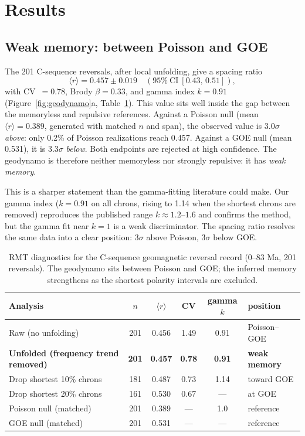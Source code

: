 \documentclass[12pt,a4paper]{article}
\begin{document}
\section{Results}

\subsection{Weak memory: between Poisson and GOE}

The 201 C-sequence reversals, after local unfolding, give a spacing ratio
\begin{equation}
\langle r\rangle = 0.457 \pm 0.019 \quad (95\%\ \mathrm{CI}\ [0.43,\,0.51]),
\end{equation}
with CV~$=0.78$, Brody $\beta=0.33$, and gamma index $k=0.91$ (Figure~\ref{fig:geodynamo}a, Table~\ref{tab:main}). This value sits well inside the gap between the memoryless and repulsive references. Against a Poisson null (mean $\langle r\rangle=0.389$, generated with matched $n$ and span), the observed value is $3.0\sigma$ \emph{above}: only 0.2\% of Poisson realizations reach 0.457. Against a GOE null (mean 0.531), it is $3.3\sigma$ \emph{below}. Both endpoints are rejected at high confidence. The geodynamo is therefore neither memoryless nor strongly repulsive: it has \emph{weak memory}.

This is a sharper statement than the gamma-fitting literature could make. Our gamma index ($k=0.91$ on all chrons, rising to 1.14 when the shortest chrons are removed) reproduces the published range $k\approx1.2$--$1.6$ and confirms the method, but the gamma fit near $k=1$ is a weak discriminator. The spacing ratio resolves the same data into a clear position: $3\sigma$ above Poisson, $3\sigma$ below GOE.

\begin{table}[H]
\centering
\caption{RMT diagnostics for the C-sequence geomagnetic reversal record (0--83 Ma, 201 reversals). The geodynamo sits between Poisson and GOE; the inferred memory strengthens as the shortest polarity intervals are excluded.}
\label{tab:main}
\small
\begin{tabular}{lccccl}
\toprule
Analysis & $n$ & $\langle r\rangle$ & CV & gamma $k$ & position \\
\midrule
Raw (no unfolding) & 201 & 0.456 & 1.49 & 0.91 & Poisson--GOE \\
\textbf{Unfolded (frequency trend removed)} & \textbf{201} & \textbf{0.457} & \textbf{0.78} & \textbf{0.91} & \textbf{weak memory} \\
Drop shortest 10\% chrons & 181 & 0.487 & 0.73 & 1.14 & toward GOE \\
Drop shortest 20\% chrons & 161 & 0.530 & 0.67 & --- & at GOE \\
\midrule
Poisson null (matched) & 201 & 0.389 & --- & 1.0 & reference \\
GOE null (matched) & 201 & 0.531 & --- & --- & reference \\
\bottomrule
\end{tabular}
\end{table}
\end{document}
